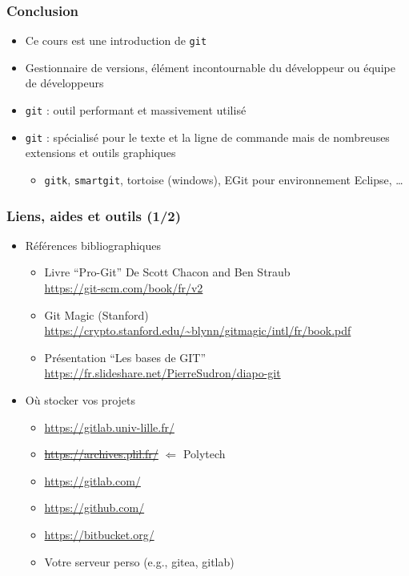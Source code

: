 \documentclass[table,tikz,12pt,svgnames]{beamer}
\begin{document}
\begin{frame}
\frametitle{Conclusion}
\begin{block}{}
\begin{itemize}
\item Ce cours est une \textcolor{title}{introduction} de \texttt{git}
\item Gestionnaire de versions, élément \textcolor{title}{incontournable} du développeur ou
équipe de développeurs
\item \texttt{git} : outil performant et \textcolor{title}{massivement utilisé}
\item \texttt{git} : spécialisé pour le texte et la ligne de commande mais de nombreuses extensions et outils graphiques
\begin{itemize}
\item \texttt{gitk}, \texttt{smartgit}, tortoise (windows), EGit pour environnement Eclipse, \ldots
\end{itemize}
\end{itemize}
\end{block}
\end{frame}



\begin{frame}
\frametitle{Liens, aides et outils (1/2)}
\begin{itemize}
	\item Références bibliographiques
	\begin{itemize}
		\item Livre ``Pro-Git'' De Scott Chacon and Ben Straub\\
		\url{https://git-scm.com/book/fr/v2}
		\item Git Magic (Stanford)\\
		\url{https://crypto.stanford.edu/~blynn/gitmagic/intl/fr/book.pdf}
		\item Présentation ``Les bases de GIT''
		\url{https://fr.slideshare.net/PierreSudron/diapo-git}

	\end{itemize}
	\vspace{1em}

	\item Où stocker vos projets
	\begin{itemize}
		\item \url{https://gitlab.univ-lille.fr/}
		\item \sout{\url{https://archives.plil.fr/}} $\Leftarrow$ Polytech
		\item \url{https://gitlab.com/}		
		\item \url{https://github.com/}
		\item \url{https://bitbucket.org/}
		\item Votre serveur perso (e.g., gitea, gitlab)
	\end{itemize}
\end{itemize}
\end{frame}
\end{document}
